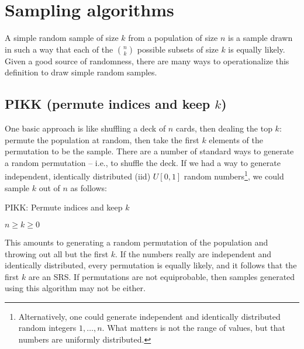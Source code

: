 \documentclass[12pt]{article}
\begin{document}
\section{Sampling algorithms}
A simple random sample of size $k$ from a population of size $n$ is a sample drawn in such a way that each of the ${n \choose k}$ possible subsets of size $k$ is equally likely.
Given a good source of randomness, there are many ways to operationalize this definition to draw simple random samples.

\subsection{PIKK (permute indices and keep $k$)}
One basic approach is like shuffling a deck of $n$ cards, then dealing the top $k$: permute the population at random, then take the first $k$ elements of the permutation to be the sample.
There are a number of standard ways to generate a random permutation -- i.e., to shuffle the deck.
If we had a way to generate independent, identically distributed (iid) $U[0,1]$ random numbers\footnote{
Alternatively, one could generate independent and identically distributed random integers $1, \dots, n$.
What matters is not the range of values, but that numbers are uniformly distributed.}, we could sample $k$ out of $n$ as follows:

\begin{algorithm}                      %
\caption{PIKK: Permute indices and keep $k$}          %
\label{PIKK}                           %
\begin{algorithmic}[1]               %
    \Require $n \geq k \geq 0$
    \Statex
\end{algorithmic}
\end{algorithm}

This amounts to generating a random permutation of the population and throwing out all but the first $k$.
If the numbers really are independent and identically distributed, every permutation is equally likely, and it follows that the first $k$ are an SRS.
If permutations are not equiprobable, then samples generated using this algorithm may not be either.
\end{document}
